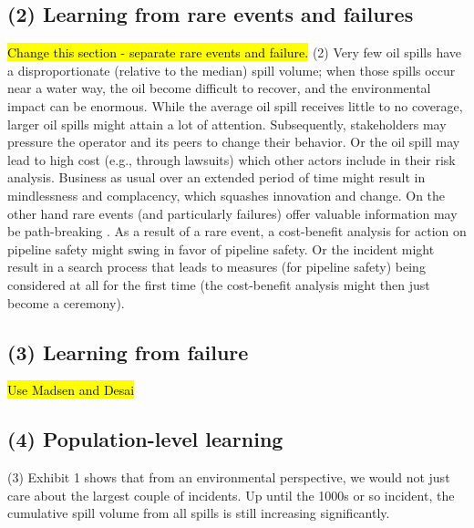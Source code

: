 \documentclass[12pt, man, natbib]{apa6}
\begin{document}
	\subsection{(2) Learning from rare events and failures}
	
	\hl{Change this section - separate rare events and failure.} (2) Very few oil spills have a disproportionate (relative to the median) spill volume; when those spills occur near a water way, the oil become difficult to recover, and the environmental impact can be enormous. While the average oil spill receives little to no coverage, larger oil spills might attain a lot of attention. Subsequently, stakeholders may pressure the operator and its peers to change their behavior. Or the oil spill may lead to high cost (e.g., through lawsuits) which other actors include in their risk analysis. Business as usual over an extended period of time might result in mindlessness and complacency, which squashes innovation and change. On the other hand rare events (and particularly failures) offer valuable information may be path-breaking \citep{March1991}. As a result of a rare event, a cost-benefit analysis for action on pipeline safety might swing in favor of pipeline safety. Or the incident might result in a search process that leads to measures (for pipeline safety) being considered at all for the first time (the cost-benefit analysis might then just become a ceremony).
	
	
	\subsection{(3) Learning from failure}
	
	\hl{Use Madsen and Desai}
	
	\subsection{(4) Population-level learning}
	
	(3) Exhibit 1 shows that from an environmental perspective, we would not just care about the largest couple of incidents. Up until the 1000s or so incident, the cumulative spill volume from all spills is still increasing significantly.
	

\end{document}
